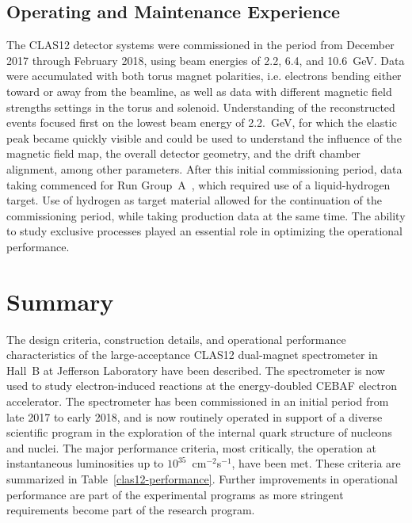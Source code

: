 \documentclass[final,3p,twocolumn]{elsarticle}
\begin{document}
\subsection{Operating and Maintenance Experience}

The CLAS12 detector systems were commissioned in the period from December 2017 through February 2018, using
beam energies of 2.2, 6.4, and 10.6~GeV. Data were accumulated with both torus magnet polarities, i.e. electrons
bending either toward or away from the beamline, as well as data with different magnetic field strengths settings
in the torus and solenoid. Understanding of the reconstructed events focused first on the lowest beam energy of
2.2.~GeV, for which the elastic peak became quickly visible and could be used to understand the influence of the
magnetic field map, the overall detector geometry, and the drift chamber alignment, among other parameters. After
this initial commissioning period, data taking commenced for Run Group~A~\cite{rg-details}, which required use of a
liquid-hydrogen target. Use of hydrogen as target material allowed for the continuation of the commissioning period,
while taking production data at the same time. The ability to study exclusive processes played an essential role in
optimizing the operational performance. 

\section{Summary} 

The design criteria, construction details, and operational performance characteristics of the large-acceptance
CLAS12 dual-magnet spectrometer in Hall~B at Jefferson Laboratory have been described. The spectrometer is
now used to study electron-induced reactions at the energy-doubled CEBAF electron accelerator. The spectrometer
has been commissioned in an initial period from late 2017 to early 2018, and is now routinely operated in support of
a diverse scientific program in the exploration of the internal quark structure of nucleons and nuclei. The major
performance criteria, most critically, the operation at  instantaneous luminosities up to $10^{35}$~cm$^{-2}$s$^{-1}$,
have been met. These criteria are summarized in Table~\ref{clas12-performance}. Further improvements in
operational performance are part of the experimental programs as more stringent requirements become part of the
research program.  
\end{document}

